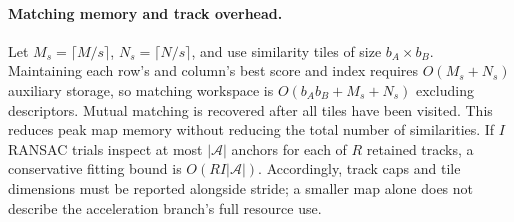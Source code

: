 \paragraph{Matching memory and track overhead.}
Let $M_s=\lceil M/s\rceil$, $N_s=\lceil N/s\rceil$, and use similarity tiles of size
$b_A\times b_B$. Maintaining each row's and column's best score and index requires
$O(M_s+N_s)$ auxiliary storage, so matching workspace is
$O(b_A b_B+M_s+N_s)$ excluding descriptors. Mutual matching is recovered after all tiles
have been visited. This reduces peak map memory without reducing the total number of
similarities. If $I$ RANSAC trials inspect at most $|\mathcal A|$ anchors for each of
$R$ retained tracks, a conservative fitting bound is $O(RI|\mathcal A|)$.
Accordingly, track caps and tile dimensions must be reported alongside stride; a smaller
map alone does not describe the acceleration branch's full resource use.
